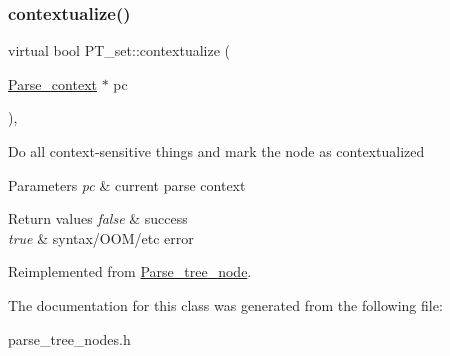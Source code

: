 \subsubsection{\texorpdfstring{contextualize()}{contextualize()}}
{\footnotesize\ttfamily virtual bool P\+T\+\_\+set\+::contextualize (\begin{DoxyParamCaption}\item[{\mbox{\hyperlink{structParse__context}{Parse\+\_\+context}} $\ast$}]{pc }\end{DoxyParamCaption})\hspace{0.3cm}{\ttfamily [inline]}, {\ttfamily [virtual]}}

Do all context-\/sensitive things and mark the node as contextualized


\begin{DoxyParams}{Parameters}
{\em pc} & current parse context\\
\hline
\end{DoxyParams}

\begin{DoxyRetVals}{Return values}
{\em false} & success \\
\hline
{\em true} & syntax/\+O\+O\+M/etc error \\
\hline
\end{DoxyRetVals}


Reimplemented from \mbox{\hyperlink{classParse__tree__node_a22d93524a537d0df652d7efa144f23da}{Parse\+\_\+tree\+\_\+node}}.



The documentation for this class was generated from the following file\+:\begin{DoxyCompactItemize}
\item 
parse\+\_\+tree\+\_\+nodes.\+h\end{DoxyCompactItemize}
